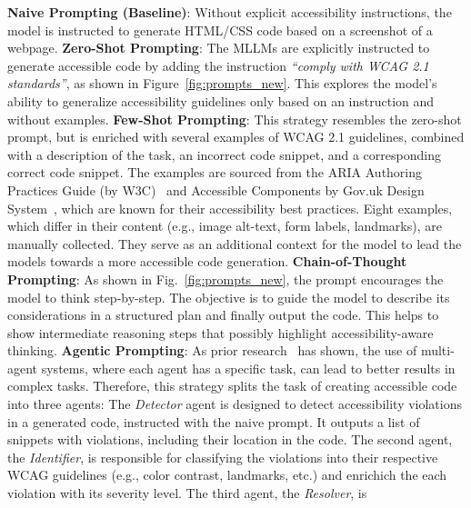 \noindent
\textbf{Naive Prompting (Baseline)}: 
  Without explicit accessibility instructions, the model is
  instructed to generate HTML/CSS code based on a screenshot of a webpage.\newline
\noindent
\textbf{Zero-Shot Prompting}: 
  The MLLMs are explicitly instructed to 
  generate accessible code by adding the instruction \textit{``comply with WCAG 2.1 standards''}, 
  as shown in Figure~\ref{fig:prompts_new}. 
  This explores the model's ability to generalize accessibility guidelines 
  only based on an instruction and without examples.\newline
\noindent
\textbf{Few-Shot Prompting}: 
  This strategy resembles the zero-shot prompt,
  but is enriched with several examples of WCAG 2.1 guidelines, combined 
  with a description of the task, an incorrect code snippet, and a 
  corresponding correct code snippet.
  The examples are sourced from the ARIA Authoring Practices Guide 
  (by W3C)~\cite{web:w3c_examples} and Accessible Components by Gov.uk 
  Design System~\cite{web:govuk}, which are known for their accessibility
  best practices.
  Eight examples, which differ in their content (e.g., image alt-text, 
  form labels, landmarks), are manually collected. They serve as an 
  additional context for the model to lead the models towards a more 
  accessible code generation.\newline
\noindent
\textbf{Chain-of-Thought Prompting}: 
  As shown in Fig.~\ref{fig:prompts_new}, 
  the prompt encourages the model to think step-by-step. 
  The objective is to guide the model to describe its 
  considerations in a structured plan and finally output the code.
  This helps to show intermediate reasoning steps that possibly 
  highlight accessibility-aware thinking.\newline
\noindent
\textbf{Agentic Prompting}: 
  As prior research~\cite{wu2023autogen} has shown, the use of multi-agent 
  systems, where each agent has a specific task, can lead to better
  results in complex tasks. Therefore, this strategy splits the 
  task of creating accessible code into three agents: The 
  \textit{Detector} agent is designed to detect accessibility violations 
  in a generated code, instructed with the naive prompt. It outputs a list
  of snippets with violations, including their location in the code. The 
  second agent, the \textit{Identifier}, is responsible for classifying 
  the violations into their respective WCAG guidelines (e.g., 
  color contrast, landmarks, etc.) and enrichich the each violation with 
  its severity level. The third agent, the \textit{Resolver}, is 
